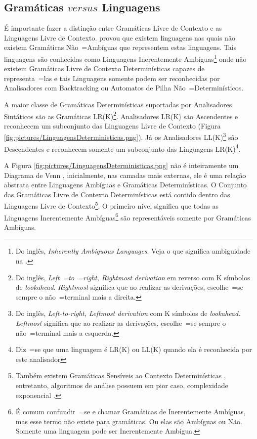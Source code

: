 {\subsection{Gramáticas $versus$ Linguagens}
\label{gramaticasVersusLinguagens}

    É importante fazer a distinção entre Gramáticas Livre de Contexto e
    as Linguagens Livre de Contexto.
     provou que existem linguagens nas quais não existem Gramáticas Não~=Ambíguas que representem estas linguagens.
    Tais linguagens são conhecidas como Linguagens Inerentemente Ambíguas\footnote{
    Do inglês,
    \textit{Inherently Ambiguous Languages}.
    Veja o que significa ambiguidade na .
    }
    onde não existem Gramáticas Livre de Contexto Determinísticas capazes de representa~=las e
    tais Linguagens somente podem ser reconhecidas por Analisadores com Backtracking \cite{ahoCompilerDragonBook} ou
    Automatos de Pilha Não~=Determinísticos.

    A maior classe de Gramáticas Determinísticas suportadas por Analisadores Sintáticos são as Gramáticas LR(K)\footnote{
    Do inglês, \textit{Left~=to~=right,
    Rightmost derivation} em reverso com K símbolos de \textit{lookahead}.
    \textit{Rightmost} significa que ao realizar as derivações,
    escolhe~=se sempre o não~=terminal mais a direita.
    }.
    Analisadores LR(K) \cite{ahoCompilerDragonBook} são Ascendentes e
    reconhecem um subconjunto das Linguagens Livre de Contexto (Figura \ref{fig:pictures/LinguagensDeterministicas.png}).
    Já os Analisadores LL(K)\footnote{
    Do inglês, \textit{Left-to-right,
    Leftmost derivation} com K símbolos de \textit{lookahead}.
    \textit{Leftmost} significa que ao realizar as derivações,
    escolhe~=se sempre o não~=terminal mais a esquerda.
    }
    são Descendentes \cite{antlrBookTerrentParr,llStarAntlr,allStarAntlr} e
    reconhecem somente um subconjunto das Linguagens LR(K)\footnote{
    Diz~=se que uma linguagem é LR(K) ou
    LL(K) quando ela é reconhecida por este analisador
    }.

    A Figura \ref{fig:pictures/LinguagensDeterministicas.png} não é inteiramente um Diagrama de Venn \cite{generalizedVennDiagrams},
    inicialmente,
    nas camadas mais externas,
    ele é uma relação abstrata entre Linguagens Ambíguas e
    Gramáticas Determinísticas.
    O Conjunto das Gramáticas Livre de Contexto Determinísticas está contido dentro das Linguagens Livre de Contexto\footnote{
    Também existem Gramáticas Sensíveis ao Contexto Determinísticas \cite{contextSensitiveParsing},
    entretanto,
    algoritmos de análise possuem em pior caso,
    complexidade exponencial \cite{areContextSensitiveGrammarWithPolynomialTime}.
    }.
    O primeiro nível significa que todas as Linguagens Inerentemente Ambíguas\footnote{
    É comum confundir~=se e
    chamar Gramáticas de Inerentemente Ambíguas,
    mas esse termo não existe para gramáticas.
    Ou elas são Ambíguas ou
    Não.
    Somente uma linguagem pode ser Inerentemente Ambígua.
    }
    são representáveis somente por Gramáticas Ambíguas.

}
